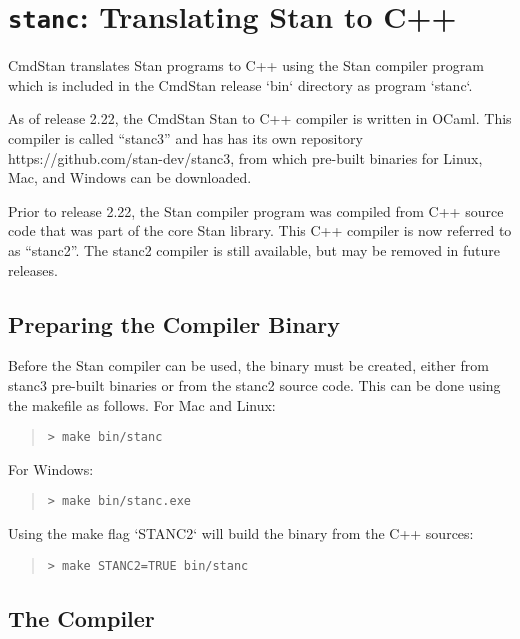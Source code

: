\chapter{{\tt\bfseries stanc}: Translating Stan to C++}\label{stanc.chapter}


CmdStan  translates Stan programs to C++ using the Stan compiler program which
is included in the CmdStan release `bin` directory as program `stanc`.

As of release 2.22, the CmdStan Stan to C++ compiler is 
written in OCaml.
This compiler is called ``stanc3'' and has has its own repository
https://github.com/stan-dev/stanc3, from which pre-built binaries
for Linux, Mac, and Windows can be downloaded.

Prior to release 2.22, the Stan compiler program was compiled from C++ source code
that was part of the core Stan library.
This C++ compiler is now referred to as ``stanc2''.
The stanc2 compiler is still available, but may be removed in future releases.

\section{Preparing the \stanc Compiler Binary}


Before the Stan compiler can be used, the binary \stanc must be created, either from
stanc3 pre-built binaries or from the stanc2 source code.
This can be done using the makefile as follows. For Mac and Linux:
%
\begin{quote}
\begin{Verbatim}[fontshape=sl]
> make bin/stanc
\end{Verbatim}
\end{quote}
%
For Windows:
%
\begin{quote}
\begin{Verbatim}[fontshape=sl]
> make bin/stanc.exe
\end{Verbatim}
\end{quote}
%

Using the make flag `STANC2` will build the \stanc binary from the C++ sources:
%
\begin{quote}
\begin{Verbatim}[fontshape=sl]
> make STANC2=TRUE bin/stanc
\end{Verbatim}
\end{quote}
%


\section{The \stanc Compiler}


